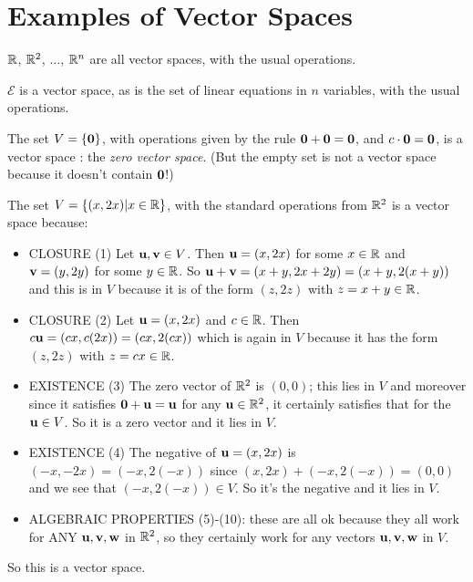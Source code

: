 \section{Examples of Vector Spaces}

\begin{myexample} $\mathbb{R}$, $\mathbb{R}^2$, $\ldots$, $\mathbb{R}^n$ are all vector spaces, with
the usual operations. \end{myexample}

\begin{myexample} $\mathcal{E}$ is a vector space, as is the set of 
linear equations in $n$ variables, with the usual operations. \end{myexample}

\begin{myexample} The set $V = \{\mathbf{0}\}$, with operations given by the rule 
$\mathbf{0} + \mathbf{0} = \mathbf{0}$, and $c \cdot \mathbf{0} = \mathbf{0}$, is a vector space :  the \emph{zero vector
space}.  (But the empty set is not a vector space because it doesn't contain $\mathbf{0}$!) \end{myexample}

\begin{myexample} The set $V = \{(x,2x) | x \in \mathbb{R}\}$, with the standard operations
from $\mathbb{R}^2$ is a vector space because:
\begin{itemize}
\item CLOSURE (1) Let $\mathbf{u}, \mathbf{v} \in V$.  Then $\mathbf{u} = (x,2x)$ for some
$x\in\mathbb{R}$ and $\mathbf{v} = (y,2y)$ for some $y\in \mathbb{R}$.  So $\mathbf{u} + \mathbf{v} = (x+y, 2x+2y) = (x+y, 2(x+y))$ and this is in $V$ because it is of the form $(z,2z)$ 
with $z = x+y \in \mathbb{R}$.
\item CLOSURE (2) Let $\mathbf{u} = (x,2x)$ and $c\in \mathbb{R}$.  Then $c\mathbf{u} = (cx,c(2x))=(cx,2(cx))$ which is again in $V$ because it has the form $(z,2z)$ with $z=cx \in \mathbb{R}$.
\item EXISTENCE (3) The zero vector of $\mathbb{R}^2$ is $(0,0)$; this lies in $V$
and moreover since it satisfies $\mathbf{0} + \mathbf{u} = \mathbf{u}$ for any $\mathbf{u} \in\mathbb{R}^2$,
it certainly satisfies that for the $\mathbf{u} \in V$.  So it is a zero vector
and it lies in $V$.
\item EXISTENCE (4) The negative of $\mathbf{u} = (x,2x)$ is $(-x,-2x) = (-x,2(-x))$
since $(x,2x)+(-x,2(-x))=(0,0)$ and we see that $(-x,2(-x))\in V$.  So
it's the negative and it lies in $V$.
\item ALGEBRAIC PROPERTIES  (5)-(10):  these are all ok because they
all work for ANY $\mathbf{u}, \mathbf{v},\mathbf{w}$ in $\mathbb{R}^2$, so they certainly work
for any vectors  $\mathbf{u}, \mathbf{v},\mathbf{w}$  in $V$.
\end{itemize}
So this is a vector space. \end{myexample}

